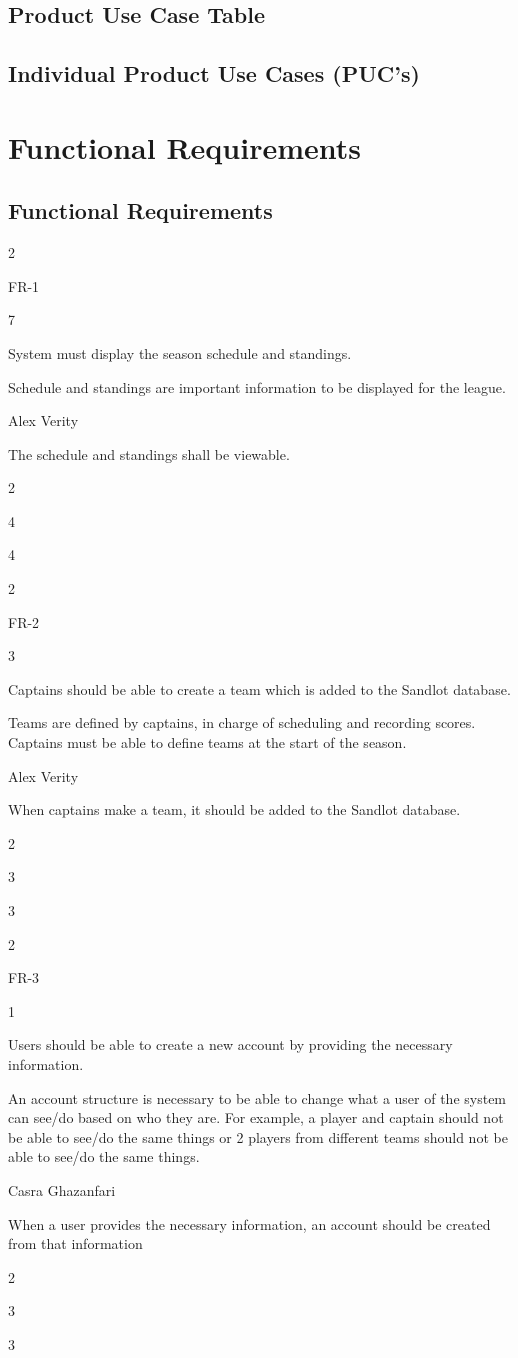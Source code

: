 \documentclass[12pt]{article}
\newenvironment{myreq}[1]{%
\setlist[description]{font=\normalfont\color{darkgray}}%
\begin{tcolorbox}[colframe=black,colback=white, sharp corners, boxrule=1pt]%
\bfseries\color{blue}%
\begin{description}#1}%
{\end{description}\end{tcolorbox}}
\newcommand{\twoinline}[2]{\begin{multicols}{2}#1 #2\end{multicols}}
\newcommand{\reqno}{\item[Requirement \#:]}
\newcommand{\reqevent}{\item[Event/BUC/PUC \#:]}
\newcommand{\reqdesc}{\item[Description:]}
\newcommand{\reqrat}{\item[Rationale:]}
\newcommand{\reqorig}{\item[Originator:]}
\newcommand{\reqfit}{\item[Fit Criterion:]}
\newcommand{\reqsatis}{\item[Customer Satisfaction:]}
\newcommand{\reqdissat}{\item[Customer Dissatisfaction:]}
\begin{document}
\subsection{Product Use Case Table}

\subsection{Individual Product Use Cases (PUC's)}


\section{Functional Requirements}
\subsection{Functional Requirements}

\begin{myreq}
  \twoinline
    {\reqno FR-1}
    {\reqevent 7}
  \reqdesc System must display the season schedule and standings.
  \reqrat Schedule and standings are important information to be displayed for the league.
  \reqorig Alex Verity
  \reqfit The schedule and standings shall be viewable.
  \twoinline
    {\reqsatis 4}
    {\reqdissat 4}
\end{myreq}

\begin{myreq}
  \twoinline
    {\reqno FR-2}
    {\reqevent 3}
  \reqdesc Captains should be able to create a team which is added to the
  Sandlot database.
  \reqrat Teams are defined by captains, in charge of scheduling and
  recording scores. Captains must be able to define teams at the start of the
  season.
  \reqorig Alex Verity
  \reqfit When captains make a team, it should be added to the Sandlot
  database.
  \twoinline
    {\reqsatis 3}
    {\reqdissat 3}
\end{myreq}

\begin{myreq}
  \twoinline
    {\reqno FR-3}
    {\reqevent 1}
  \reqdesc Users should be able to create a new account by providing 
  the necessary information. 
  \reqrat An account structure is necessary to be able to change 
  what a user of the system can see/do based on who they are. 
  For example, a player and captain should not be able to see/do 
  the same things or 2 players from different teams should not be 
  able to see/do the same things.
  \reqorig Casra Ghazanfari
  \reqfit When a user provides the necessary information, an account 
  should be created from that information
  \twoinline
    {\reqsatis 3}
    {\reqdissat 3}
\end{myreq}
\end{document}
